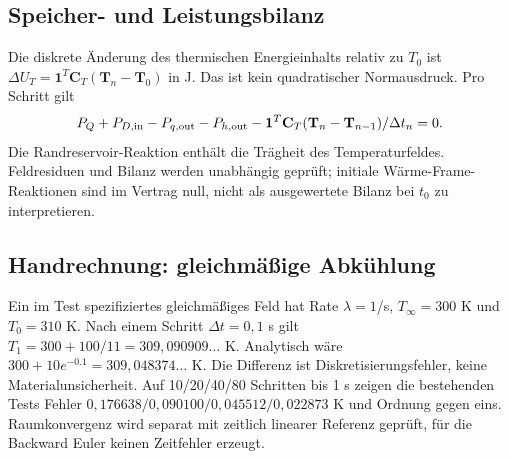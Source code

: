 \subsection{Speicher- und Leistungsbilanz}
Die diskrete Änderung des thermischen Energieinhalts relativ zu $T_0$ ist
$\Delta U_T=\mathbf1^T\mathbf C_T(\mathbf T_n-\mathbf T_0)$ in J.
Das ist kein quadratischer Normausdruck. Pro Schritt gilt
\begin{equation}\label{eq:transient-balance}
P_Q+P_{D,\rm in}-P_{q,\rm out}-P_{h,\rm out}
-\mathbf1^T\mathbf C_T(\mathbf T_n-\mathbf T_{n-1})/\Delta t_n=0.
\end{equation}
Die Randreservoir-Reaktion enthält die Trägheit des Temperaturfeldes.
Feldresiduen und Bilanz werden unabhängig geprüft; initiale
Wärme-Frame-Reaktionen sind im Vertrag null, nicht als ausgewertete Bilanz
bei $t_0$ zu interpretieren.

\subsection{Handrechnung: gleichmäßige Abkühlung}
Ein im Test spezifiziertes gleichmäßiges Feld hat Rate $\lambda=1$/s,
$T_\infty=300$ K und $T_0=310$ K. Nach einem Schritt $\Delta t=0{,}1$ s gilt
$T_1=300+100/11=309{,}090909\ldots$ K.
Analytisch wäre $300+10e^{-0.1}=309{,}048374\ldots$ K.
Die Differenz ist Diskretisierungsfehler, keine Materialunsicherheit.
Auf 10/20/40/80 Schritten bis 1 s zeigen die bestehenden Tests Fehler
$0{,}176638/0{,}090100/0{,}045512/0{,}022873$ K und Ordnung gegen eins.
Raumkonvergenz wird separat mit zeitlich linearer Referenz geprüft, für die
Backward Euler keinen Zeitfehler erzeugt.

